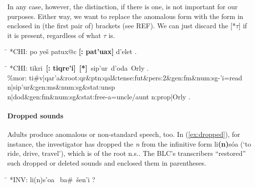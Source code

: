 In any case, however, the distinction, if there is one, is not important for our  purposes. 
Either way, we want to replace the anomalous form with the form in enclosed in 
(the first pair of) brackets (see REF). We can just discard the \textsf{[*$\tau$]} 
if it is present, regardless of what $\tau$ is.

\begin{exe} 
\ex \begin{xlist} 
   \ex\label{ex:repl1} \begin{tabbing}  
	\hspace{0.6in} \= \hspace{5.5in} \kill
	\textsf{*\ac{CH}I:} \> \textsf{po ye\v{s} patux@c \textbf{[: pat\a'{u}ax]} d\a'{e}let .}
	\end{tabbing}
     \ex\label{ex:repl2} \begin{tabbing}
	\hspace{0.6in} \= \hspace{5.5in} \kill
	\textsf{*\ac{CH}I:} \> \textsf{tikri \,\textbf{[: tiqre\a'{i}]}\, \textbf{[*]}\, 
	sip\a'{u}r\, d\a'{o}da\, Orly .} \\
	\textsf{\%mor:} \> \textsf{ti\#v|qar\a'{a}\&root:qr\&ptn:qal\&tense:fut\&pers:2\&gen:fm\&num:sg-\a'{i}=read} \\
                    \> \textsf{n|sip\a'{u}r\&gen:ms\&num:sg\&stat:unsp } \\
                    \> \textsf{n|dod\&gen:fm\&num:sg\&stat:free-a=uncle/aunt} \textsf{n:prop|Orly .}
	\end{tabbing}
   \end{xlist}
\end{exe}

\paragraph{Dropped sounds}
Adults produce anomalous or non-standard speech, too. In (\ref{ex:dropped}), for instance, the investigator 
has dropped the 
\emph{n} from the infinitive form 
\textsf{li\textbf{(n)}s\'oa} (`to ride, drive, travel'), 
which is of the root n.s.. 
The \ac{BLC}'s transcribers ``restored'' such dropped or deleted sounds and enclosed them in parentheses.
\begin{exe} \label{ex:dropped}
\ex \begin{tabbing}
\hspace{0.6in} \= \hspace{5.5in} \kill
\textsf{*INV:} \> \textsf{li(n)s\a'{o}a \, ba\#\, \v{s}en\a'{i} ?}
\end{tabbing}
\end{exe}

